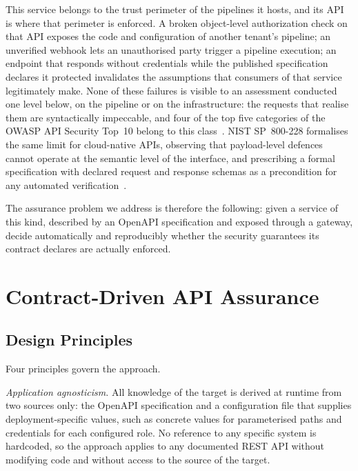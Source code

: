 \documentclass[
]{ceurart}
\begin{document}
This service belongs to the trust perimeter of the pipelines it hosts, and its API is where that perimeter is enforced.
A broken object-level authorization check on that API exposes the code and configuration of another tenant's pipeline; an unverified webhook lets an unauthorised party trigger a pipeline execution; an endpoint that responds without credentials while the published specification declares it protected invalidates the assumptions that consumers of that service legitimately make.
None of these failures is visible to an assessment conducted one level below, on the pipeline or on the infrastructure: the requests that realise them are syntactically impeccable, and four of the top five categories of the OWASP API Security Top~10 belong to this class~\cite{OWASPTop10}.
NIST SP~800-228 formalises the same limit for cloud-native APIs, observing that payload-level defences cannot operate at the semantic level of the interface, and prescribing a formal specification with declared request and response schemas as a precondition for any automated verification~\cite{chandramouliGuidelinesAPIProtection2026}.

The assurance problem we address is therefore the following: given a service of this kind, described by an OpenAPI specification and exposed through a gateway, decide automatically and reproducibly whether the security guarantees its contract declares are actually enforced.



\section{Contract-Driven API Assurance}
\label{sec:method}

\subsection{Design Principles}

Four principles govern the approach.

\emph{Application agnosticism.} All knowledge of the target is derived at runtime from two sources only: the OpenAPI specification and a configuration file that supplies deployment-specific values, such as concrete values for parameterised paths and credentials for each configured role.
No reference to any specific system is hardcoded, so the approach applies to any documented REST API without modifying code and without access to the source of the target.
\end{document}
